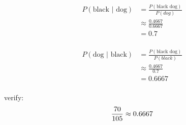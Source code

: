 \documentclass[landscape]{exam}
\begin{document}
  \begin{align*}
    P(\text{black | dog}) & = \frac{P(\text{black dog})}{P(dog)} \\
                          & \approx \frac{0.4667}{0.6667} \\
                          & = 0.7 \\
  \end{align*}

  \begin{align*}
    P(\text{dog | black}) & = \frac{P(\text{black dog})}{P(black)} \\
                          & \approx \frac{0.4667}{0.7} \\
                          & = 0.6667 \\
  \end{align*}

  verify:
  \[
    \frac{70}{105} \approx 0.6667 \\
  \]
\end{document}
